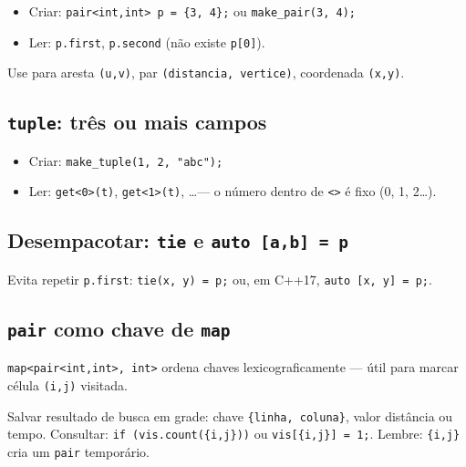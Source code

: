 \begin{itemize}[nosep]
  \item Criar: \texttt{pair<int,int> p = \{3, 4\};} ou \texttt{make\_pair(3, 4);}
  \item Ler: \texttt{p.first}, \texttt{p.second} (não existe \texttt{p[0]}).
\end{itemize}

Use para aresta \texttt{(u,v)}, par \texttt{(distancia, vertice)}, coordenada \texttt{(x,y)}.

\subsection{\texttt{tuple}: três ou mais campos}

\begin{itemize}[nosep]
  \item Criar: \texttt{make\_tuple(1, 2, "abc");}
  \item Ler: \texttt{get<0>(t)}, \texttt{get<1>(t)}, \ldots --- o número dentro de \texttt{<>} é fixo (0, 1, 2\ldots).
\end{itemize}

\subsection{Desempacotar: \texttt{tie} e \texttt{auto [a,b] = p}}

Evita repetir \texttt{p.first}: \texttt{tie(x, y) = p;} ou, em C++17, \texttt{auto [x, y] = p;}.

\subsection{\texttt{pair} como chave de \texttt{map}}

\texttt{map<pair<int,int>, int>} ordena chaves lexicograficamente --- útil para marcar célula \texttt{(i,j)} visitada.

\begin{exemplodiabox}
Salvar resultado de busca em grade: chave \texttt{\{linha, coluna\}}, valor distância ou tempo. Consultar: \texttt{if (vis.count(\{i,j\}))} ou \texttt{vis[\{i,j\}] = 1;}. Lembre: \texttt{\{i,j\}} cria um \texttt{pair} temporário.
\end{exemplodiabox}


